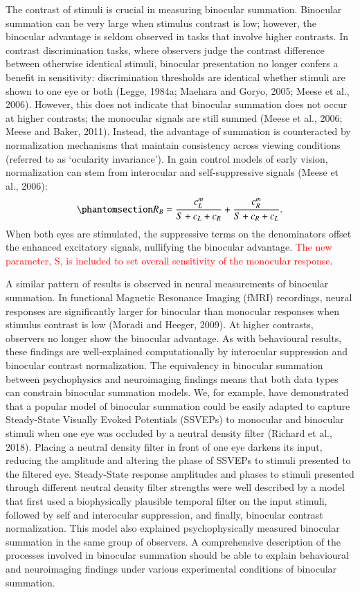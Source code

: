 \documentclass[review,
  12pt,
]{elsarticle}
\begin{document}
The contrast of stimuli is crucial in measuring binocular summation.
Binocular summation can be very large when stimulus contrast is low;
however, the binocular advantage is seldom observed in tasks that
involve higher contrasts. In contrast discrimination tasks, where
observers judge the contrast difference between otherwise identical
stimuli, binocular presentation no longer confers a benefit in
sensitivity: discrimination thresholds are identical whether stimuli are
shown to one eye or both (Legge, 1984a; Maehara and Goryo, 2005; Meese
et al., 2006). However, this does not indicate that binocular summation
does not occur at higher contrasts; the monocular signals are still
summed (Meese et al., 2006; Meese and Baker, 2011). Instead, the
advantage of summation is counteracted by normalization mechanisms that
maintain consistency across viewing conditions (referred to as
`ocularity invariance'). In gain control models of early vision,
normalization can stem from interocular and self-suppressive signals
(Meese et al., 2006):
\begin{equation}\phantomsection\label{eq-intoMath2}{
R_B = \frac{c_L^m}{S+c_L+c_R} + \frac{c_R^m}{S+c_R+c_L}.
}\end{equation} When both eyes are stimulated, the suppressive terms on
the denominators offset the enhanced excitatory signals, nullifying the
binocular advantage. \textcolor{red}{The new parameter, S, is included to set
overall sensitivity of the monocular response}.

A similar pattern of results is observed in neural measurements of
binocular summation. In functional Magnetic Resonance Imaging (fMRI)
recordings, neural responses are significantly larger for binocular than
monocular responses when stimulus contrast is low (Moradi and Heeger,
2009). At higher contrasts, observers no longer show the binocular
advantage. As with behavioural results, these findings are
well-explained computationally by interocular suppression and binocular
contrast normalization. The equivalency in binocular summation between
psychophysics and neuroimaging findings means that both data types can
constrain binocular summation models. We, for example, have demonstrated
that a popular model of binocular summation could be easily adapted to
capture Steady-State Visually Evoked Potentials (SSVEPs) to monocular
and binocular stimuli when one eye was occluded by a neutral density
filter (Richard et al., 2018). Placing a neutral density filter in front
of one eye darkens its input, reducing the amplitude and altering the
phase of SSVEPs to stimuli presented to the filtered eye. Steady-State
response amplitudes and phases to stimuli presented through different
neutral density filter strengths were well described by a model that
first used a biophysically plausible temporal filter on the input
stimuli, followed by self and interocular suppression, and finally,
binocular contrast normalization. This model also explained
psychophysically measured binocular summation in the same group of
observers. A comprehensive description of the processes involved in
binocular summation should be able to explain behavioural and
neuroimaging findings under various experimental conditions of binocular
summation.
\end{document}
